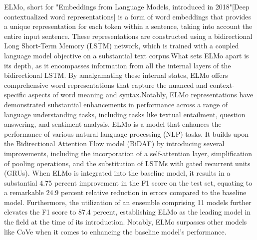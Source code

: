 \documentclass[conference]{IEEEtran}
\begin{document}

ELMo, short for "Embeddings from Language Models, introduced in 2018"[Deep contextualized word representations] is a form of word embeddings that provides a unique representation for each token within a sentence, taking into account the entire input sentence. These representations are constructed using a bidirectional Long Short-Term Memory (LSTM) network, which is trained with a coupled language model objective on a substantial text corpus.What sets ELMo apart is its depth, as it encompasses information from all the internal layers of the bidirectional LSTM. By amalgamating these internal states, ELMo offers comprehensive word representations that capture the nuanced and context-specific aspects of word meaning and syntax.Notably, ELMo representations have demonstrated substantial enhancements in performance across a range of language understanding tasks, including tasks like textual entailment, question answering, and sentiment analysis.
ELMo is a model that enhances the performance of various natural language processing (NLP) tasks. It builds upon the Bidirectional Attention Flow model (BiDAF) by introducing several improvements, including the incorporation of a self-attention layer, simplification of pooling operations, and the substitution of LSTMs with gated recurrent units (GRUs). When ELMo is integrated into the baseline model, it results in a substantial 4.75 percent improvement in the F1 score on the test set, equating to a remarkable 24.9 percent relative reduction in errors compared to the baseline model. Furthermore, the utilization of an ensemble comprising 11 models further elevates the F1 score to 87.4 percent, establishing ELMo as the leading model in the field at the time of its introduction. Notably, ELMo surpasses other models like CoVe when it comes to enhancing the baseline model's performance.
\end{document}
